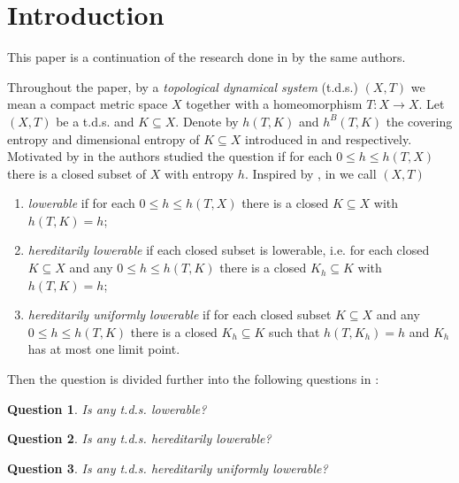 \documentclass[12pt]{amsart}
\newtheorem{ques}{Question}
\theoremstyle{definition} \theoremstyle{question}
\numberwithin{equation}{section}
\begin{document}
\section{Introduction}

This paper is a continuation of the research done in \cite{HYZ1} by
the same authors.

Throughout the paper, by a {\it topological dynamical system}
(t.d.s.) $(X, T)$ we mean a compact metric space $X$ together with a
homeomorphism $T: X\rightarrow X$. Let $(X, T)$ be a t.d.s. and
$K\subseteq X$. Denote by $h (T, K)$ and $h^B (T, K)$ the covering
entropy and dimensional entropy of $K\subseteq X$ introduced in
\cite{B} and \cite{B3} respectively. Motivated by \cite{L1, L2, LW,
SW} in \cite{HYZ1} the authors studied the question if for each
$0\le h\le h (T, X)$ there is a closed subset of $X$ with entropy
$h$. Inspired by \cite[Remark 5.13]{YZ}, in \cite{HYZ1} we call $(X,
T)$
\begin{enumerate}

\item {\it lowerable} if for each $0\le h\le h (T, X)$ there is
a closed $K\subseteq X$ with $h (T, K)= h$;

\item {\it hereditarily
lowerable} if each closed subset is lowerable, i.e. for each closed
$K\subseteq X$ and any $0\le h\le h (T, K)$ there is a closed
$K_h\subseteq K$ with $h (T,K)= h$;

\item {\it hereditarily
uniformly lowerable} if for each closed subset $K\subseteq X$ and
any $0\le h\le h (T, K)$ there is a closed $K_h\subseteq K$ such
that $h (T, K_h)= h$ and $K_h$ has at most one limit point.
\end{enumerate}

\noindent Then the question is divided further into the following
questions in \cite{HYZ1}:

\begin{ques} \label{q1}
Is any t.d.s. lowerable?
\end{ques}

\begin{ques} \label{q2}
Is any t.d.s. hereditarily lowerable?
\end{ques}

\begin{ques} \label{q3}
Is any t.d.s. hereditarily uniformly lowerable?
\end{ques}
\end{document}
